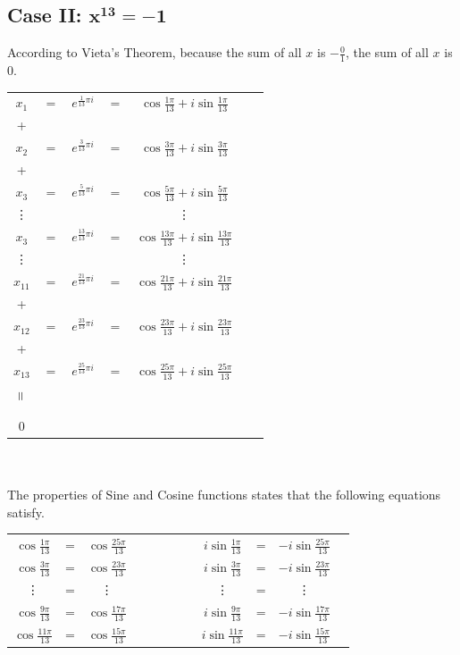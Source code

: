 \documentclass[12pt]{report}
\newcommand{\verteq}{\rotatebox{90}{$\;\;=\;\;$}}
\begin{document}
\subsection*{\textbf{Case II:} $\mathbf{x^{13}=-1}$}
According to Vieta's Theorem, because the sum of all $x$ is $-\frac{0}{1}$, the sum of all $x$ is 0. \\
\begin{tabular}{ccccccc}
    $x_1$ & $=$ & $e^{\frac{1}{13}\pi i}$ & $=$ & $\cos{\frac{1\pi}{13}} +i\sin{\frac{1\pi}{13}}$\\
    + & & & & \\
    $x_2$ & $=$ & $e^{\frac{3}{13}\pi i}$ & $=$ & $\cos{\frac{3\pi}{13}} +i\sin{\frac{3\pi}{13}}$ \\
    + & & & & \\
    $x_3$ & $=$ & $e^{\frac{5}{13}\pi i}$ & $=$ & $\cos{\frac{5\pi}{13}} +i\sin{\frac{5\pi}{13}}$ \\
    \vdots & & & & \vdots \\
    $x_3$ & $=$ & $e^{\frac{13}{13}\pi i}$ & $=$ & $\cos{\frac{13\pi}{13}} +i\sin{\frac{13\pi}{13}}$ \\
    \vdots & & & & \vdots \\
    $x_{11}$ & $=$ & $e^{\frac{21}{13}\pi i}$ & $=$ & $\cos{\frac{21\pi}{13}} +i\sin{\frac{21\pi}{13}}$ \\
    + & & & & \\
    $x_{12}$ & $=$ & $e^{\frac{23}{13}\pi i}$ & $=$ & $\cos{\frac{23\pi}{13}} +i\sin{\frac{23\pi}{13}}$ \\
    + & & & & \\
    $x_{13}$ & $=$ & $e^{\frac{25}{13}\pi i}$ & $=$ & $\cos{\frac{25\pi}{13}} +i\sin{\frac{25\pi}{13}}$ \\
    $\verteq$ & & & & \\
    0 & & & & \\
\end{tabular}
\\\\
The properties of Sine and Cosine functions states that the following equations satisfy. \\
\setlength{\tabcolsep}{10pt}
\renewcommand{\arraystretch}{1.5}
\begin{tabular}{cccccccccccc}
    $\cos{\frac{1\pi}{13}}$ & = & $\cos{\frac{25\pi}{13}}$ & & & & & & $i\sin{\frac{1\pi}{13}}$ & = & $-i\sin{\frac{25\pi}{13}}$ \\
    $\cos{\frac{3\pi}{13}}$ & = & $\cos{\frac{23\pi}{13}}$ & & & & & & $i\sin{\frac{3\pi}{13}}$ & = & $-i\sin{\frac{23\pi}{13}}$ \\
    \vdots & = & \vdots & & & & & & \vdots & = & \vdots \\
    $\cos{\frac{9\pi}{13}}$ & = & $\cos{\frac{17\pi}{13}}$ & & & & & & $i\sin{\frac{9\pi}{13}}$ & = & $-i\sin{\frac{17\pi}{13}}$ \\
    $\cos{\frac{11\pi}{13}}$ & = & $\cos{\frac{15\pi}{13}}$ & & & & & & $i\sin{\frac{11\pi}{13}}$ & = & $-i\sin{\frac{15\pi}{13}}$
\end{tabular} \\
\end{document}
